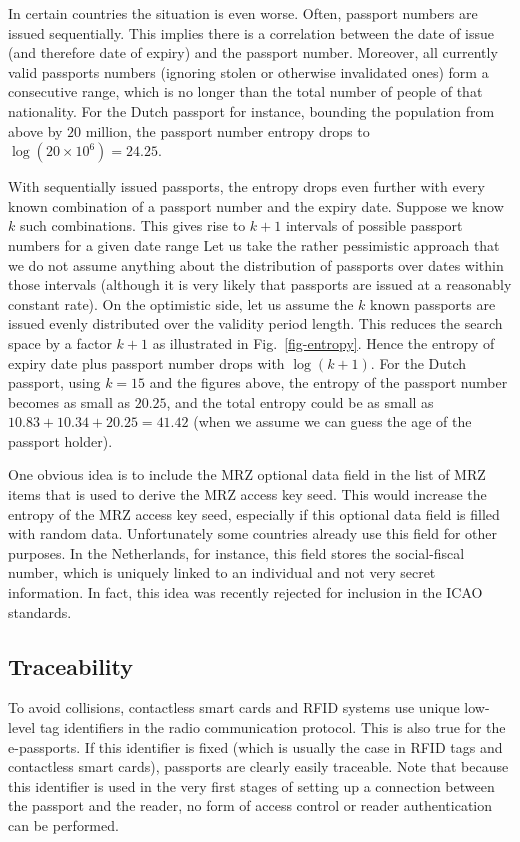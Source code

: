 \documentclass[runningheads,envcountsame,envcountsect,oribibl]{llncs}
\begin{document}
In certain countries the situation is even worse. Often, passport
numbers are issued sequentially. This implies there is a correlation between
the date of issue (and therefore date of expiry) and the passport number. Moreover,
all currently valid passports numbers (ignoring stolen or otherwise invalidated
ones) form a consecutive range, which is no longer than the total number of
people of that nationality. For the Dutch passport for instance,
bounding the population from above by $20$ million, the passport number entropy
drops to $\log(20 \times 10^6) = 24.25$.

With sequentially issued passports, the entropy drops even further with every
known combination of a passport number and the expiry date.
Suppose we know $k$ such combinations. This gives rise to
$k+1$ intervals of possible passport numbers for a given date range
Let us take the rather pessimistic approach that 
 we do not assume anything about the distribution of passports over
dates within those intervals (although it is very likely that passports are
issued at a reasonably constant rate).
On the optimistic side, let us assume the $k$ known passports are
issued evenly distributed over the validity period length.
This reduces the search space by a factor $k+1$ 
as illustrated in Fig.~\ref{fig-entropy}.
Hence the entropy 
of expiry date plus passport number drops with
$\log (k+1)$. 
For the Dutch passport, using $k=15$ and the figures above, the entropy 
of the passport number becomes as small as $20.25$, and the total
entropy could be as small as 
$10.83 + 10.34 + 20.25 = 41.42$
(when we assume we can guess the age of the passport holder).

One obvious idea is to include the MRZ optional
data field in the list of MRZ items that is used to derive the MRZ access
key seed. This would increase the entropy of the MRZ access key seed,
especially if this 
optional data field is filled with random data.
Unfortunately some countries 
already use this field for other purposes. In the Netherlands, for instance,
this field stores the social-fiscal number, which is uniquely linked to an
individual and not very secret information.
In fact, this idea was recently rejected for inclusion in the ICAO standards.

\subsection{Traceability} \label{subsec-trace}

To avoid collisions, contactless smart cards and RFID systems 
use unique low-level tag identifiers in the radio communication
protocol. This is also true for the e-passports.
If this identifier is fixed (which is usually the case in RFID tags and
contactless smart cards), passports are clearly easily traceable.
Note that because this identifier is used in the very first stages of setting
up a connection between the passport and the reader, no form of access control
or reader authentication can be performed. 
\end{document}
